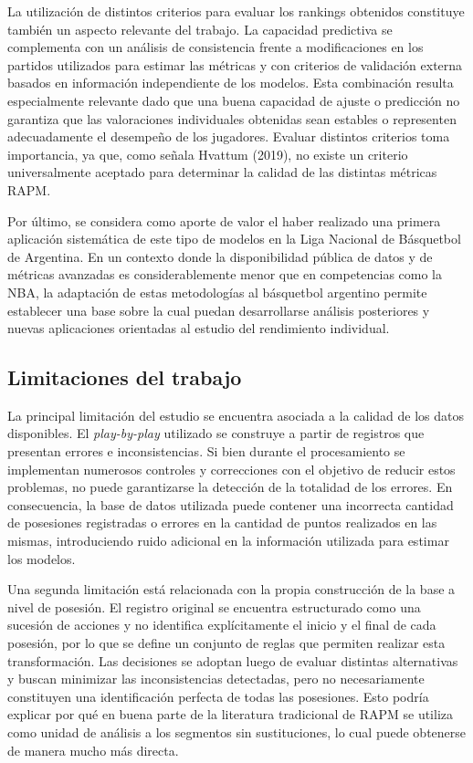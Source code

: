 \documentclass[
  12pt,
]{article}
\begin{document}
La utilización de distintos criterios para evaluar los rankings
obtenidos constituye también un aspecto relevante del trabajo. La
capacidad predictiva se complementa con un análisis de consistencia
frente a modificaciones en los partidos utilizados para estimar las
métricas y con criterios de validación externa basados en información
independiente de los modelos. Esta combinación resulta especialmente
relevante dado que una buena capacidad de ajuste o predicción no
garantiza que las valoraciones individuales obtenidas sean estables o
representen adecuadamente el desempeño de los jugadores. Evaluar
distintos criterios toma importancia, ya que, como señala Hvattum
(2019), no existe un criterio universalmente aceptado para determinar la
calidad de las distintas métricas RAPM.

Por último, se considera como aporte de valor el haber realizado una
primera aplicación sistemática de este tipo de modelos en la Liga
Nacional de Básquetbol de Argentina. En un contexto donde la
disponibilidad pública de datos y de métricas avanzadas es
considerablemente menor que en competencias como la NBA, la adaptación
de estas metodologías al básquetbol argentino permite establecer una
base sobre la cual puedan desarrollarse análisis posteriores y nuevas
aplicaciones orientadas al estudio del rendimiento individual.

\subsection{Limitaciones del trabajo}\label{limitaciones-del-trabajo}

La principal limitación del estudio se encuentra asociada a la calidad
de los datos disponibles. El \emph{play-by-play} utilizado se construye
a partir de registros que presentan errores e inconsistencias. Si bien
durante el procesamiento se implementan numerosos controles y
correcciones con el objetivo de reducir estos problemas, no puede
garantizarse la detección de la totalidad de los errores. En
consecuencia, la base de datos utilizada puede contener una incorrecta
cantidad de posesiones registradas o errores en la cantidad de puntos
realizados en las mismas, introduciendo ruido adicional en la
información utilizada para estimar los modelos.

Una segunda limitación está relacionada con la propia construcción de la
base a nivel de posesión. El registro original se encuentra estructurado
como una sucesión de acciones y no identifica explícitamente el inicio y
el final de cada posesión, por lo que se define un conjunto de reglas
que permiten realizar esta transformación. Las decisiones se adoptan
luego de evaluar distintas alternativas y buscan minimizar las
inconsistencias detectadas, pero no necesariamente constituyen una
identificación perfecta de todas las posesiones. Esto podría explicar
por qué en buena parte de la literatura tradicional de RAPM se utiliza
como unidad de análisis a los segmentos sin sustituciones, lo cual puede
obtenerse de manera mucho más directa.
\end{document}
